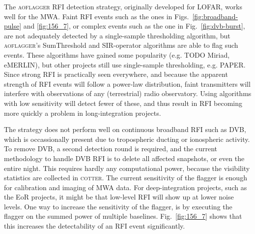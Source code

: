 \documentclass{pasa}
\begin{document}
The \textsc{aoflagger} RFI detection strategy, originally developed for LOFAR, works well for the MWA. Faint RFI events such as the ones in Figs.~\ref{fig:broadband-pulse} and \ref{fig:156_7}, or complex events such as the one in Fig.~\ref{fig:dvb-burst}, are not adequately detected by a single-sample thresholding algorithm, but \textsc{aoflagger}'s SumThreshold and SIR-operator algorithms are able to flag such events. These algorithms have gained some popularity (e.g. TODO Miriad, eMERLIN), but other projects still use single-sample thresholding, e.g. PAPER. Since strong RFI is practically seen everywhere, and because the apparent strength of RFI events will follow a power-law distribution, faint transmitters will interfere with observations of any (terrestrial) radio observatory. Using algorithms with low sensitivity will detect fewer of these, and thus result in RFI becoming more quickly a problem in long-integration projects.

The strategy does not perform well on continuous broadband RFI such as DVB, which is occassionally present due to tropospheric ducting or ionospheric activity. To remove DVB, a second detection round is required, and the current methodology to handle DVB RFI is to delete all affected snapshots, or even the entire night. This requires hardly any computational power, because the visibility statistics are collected in \textsc{cotter}. The current sensitivity of the flagger is enough for calibration and imaging of MWA data. For deep-integration projects, such as the EoR projects, it might be that low-level RFI will show up at lower noise levels. One way to increase the sensitivity of the flagger, is by executing the flagger on the summed power of multiple baselines. Fig.~\ref{fig:156_7} shows that this increases the detectability of an RFI event significantly.
\end{document}

